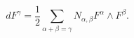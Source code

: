 \begin{equation}
dF^{\gamma }=\frac{1}{2}\sum\limits_{\alpha +\beta =\gamma }N_{\alpha
,\beta }F^{\alpha }\wedge F^{\beta }.
\end{equation}

